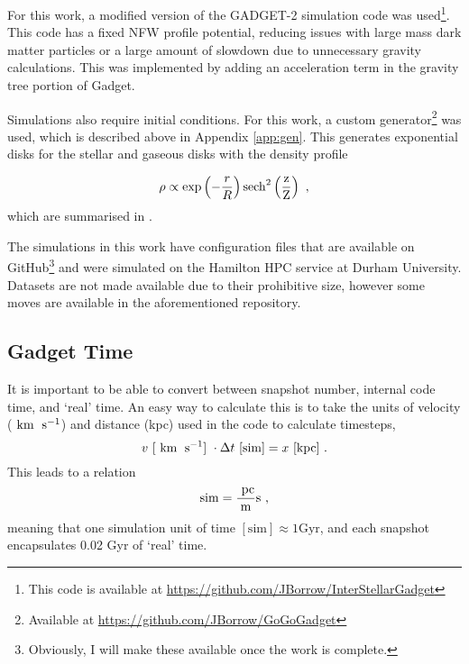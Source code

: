 For this work, a modified version of the GADGET-2 simulation code \citep{springel_cosmological_2005} was
used\footnote{This code is available at
  \url{https://github.com/JBorrow/InterStellarGadget}}. This code has a fixed
NFW profile potential, reducing issues with large mass dark matter
particles or a large amount of slowdown due to unnecessary gravity
calculations. This was implemented by adding an acceleration term in the
gravity tree portion of Gadget.

Simulations also require initial conditions. For this work, a custom
generator\footnote{Available at \url{https://github.com/JBorrow/GoGoGadget}}
was used, which is described above in Appendix \ref{app:gen}. This generates exponential disks for the stellar and gaseous
disks with the density profile

\begin{equation}
\rho \propto \exp\left(-\frac{r}{R}\right)\rm{sech}^2\left(\frac{z}{Z}\right)~,
\end{equation}
which are summarised in \citet{ferriere_interstellar_2001}.

The simulations in this work have configuration files that are
available on GitHub\footnote{Obviously, I will make these available once the work is complete.} and were simulated on the
Hamilton HPC service at Durham University. Datasets are not made
available due to their prohibitive size, however some moves are
available in the aforementioned repository.

\subsection{Gadget Time}
\label{app:gadgettime}

It is important to be able to convert between snapshot number, internal code time, and `real' time.
An easy way to calculate this is to take the units of velocity ($~\mathrm{km}\;~\mathrm{s}^{-1}$) and distance (kpc) used in the code to calculate timesteps,
$$
    v ~ [~\mathrm{km}\;~\mathrm{s}^{-1}] ~ \cdot \Delta t ~ [\mathrm{sim}] = x ~ [\mathrm{kpc}]~.
$$
This leads to a relation
$$
    \mathrm{sim} = \frac{~\mathrm{pc}}{\mathrm{m}} \mathrm{s}~,
$$
meaning that one simulation unit of time $[\mathrm{sim}] \approx 1 \mathrm{Gyr}$, and each snapshot encapsulates 0.02 Gyr of `real' time.
